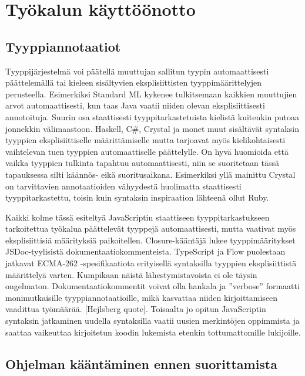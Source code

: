 \chapter{Työkalun käyttöönotto}

\section{Tyyppiannotaatiot}

Tyyppijärjestelmä voi päätellä muuttujan sallitun tyypin automaattisesti
päättelemällä tai kieleen sisältyvien eksplisiittisten tyyppimäärittelyjen
perusteella. Esimerkiksi Standard ML kykenee tulkitsemaan kaikkien muuttujien
arvot automaattisesti, kun taas Java vaatii niiden olevan eksplisiittisesti
annotoituja. Suurin osa staattisesti tyyppitarkastetuista kielistä kuitenkin
putoaa jonnekkin välimaastoon. Haskell, C\#, Crystal ja monet muut sisältävät
syntaksin tyyppien eksplisiittiselle määrittämiselle mutta tarjoavat myös
kielikohtaisesti vaihtelevan tuen tyyppien automaattiselle päättelylle.
On hyvä huomioida että vaikka tyyppien tulkinta tapahtuu automaattisesti,
niin se suoritetaan tässä tapauksessa silti käännös- eikä suoritusaikana.
Esimerkiksi yllä mainittu Crystal on tarvittavien annotaatioiden vähyydestä
huolimatta staattisesti tyyppitarkastettu, toisin kuin syntaksin inspiraation
lähteenä ollut Ruby.

Kaikki kolme tässä esiteltyä JavaScriptin staattiseen tyyppitarkastukseen
tarkoitettua työkalua päättelevät tyyppejä automaattisesti, mutta vaativat
myös eksplisiittisiä määrityksiä paikoitellen. Closure-kääntäjä lukee
tyyppimääritykset JSDoc-tyylisistä dokumentaatiokommenteista. TypeScript ja
Flow puolestaan jatkavat ECMA-262 -spesifikaatiota erityisellä syntaksilla
tyyppien eksplisiittistä määrittelyä varten. Kumpikaan näistä
lähestymistavoista ei ole täysin ongelmaton. Dokumentaatiokommentit voivat
olla hankala ja ”verbose” formaatti monimutkaisille tyyppiannotaatioille,
mikä kasvattaa niiden kirjoittamiseen vaadittua työmäärää. [Hejlsberg quote].
Toisaalta jo opitun JavaScriptin syntaksin jatkaminen uudella syntaksilla
vaatii uusien merkintöjen oppimmista ja saattaa vaikeuttaa kirjoitetun koodin
lukemista etenkin tottumattomille lukijoille.

\section{Ohjelman kääntäminen ennen suorittamista}

